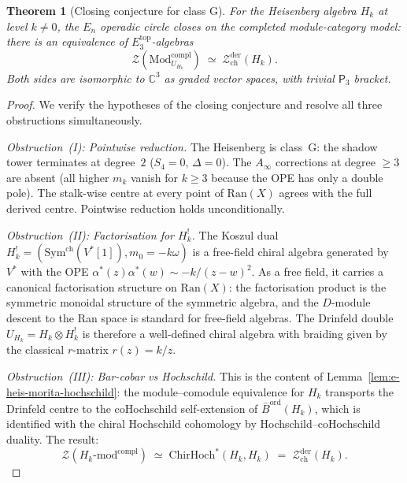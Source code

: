 \documentclass[11pt,reqno]{amsart}
\newtheorem{theorem}{Theorem}[section]
\theoremstyle{definition}
\theoremstyle{remark}
\providecommand{\cZ}{\mathcal{Z}}
\providecommand{\Ran}{\mathrm{Ran}}
\providecommand{\Ainf}{A_\infty}
\providecommand{\Ethree}{E_3}
\providecommand{\En}{E_n}
\providecommand{\Pthree}{\mathsf{P}_3}
\providecommand{\Barord}{\bar{B}^{\mathrm{ord}}}
\providecommand{\ChirHoch}{\mathrm{ChirHoch}}
\providecommand{\bC}{\mathbb{C}}
\providecommand{\Sym}{\mathrm{Sym}}
\begin{document}
\begin{theorem}[Closing conjecture for class G]
\label{thm:e-closing-class-g}
For the Heisenberg algebra $H_k$ at level $k \neq 0$, the
$\En$ operadic circle closes on the completed module-category model:
there is an equivalence of $\Ethree^{\mathrm{top}}$-algebras
\begin{equation}\label{eq:e-closing-class-g}
\mathcal Z(\mathrm{Mod}^{\mathrm{compl}}_{U_{H_k}})
\;\simeq\;
\cZ^{\mathrm{der}}_{\mathrm{ch}}(H_k).
\end{equation}
Both sides are isomorphic to $\bC^3$ as graded vector spaces,
with trivial $\Pthree$ bracket.
\end{theorem}

\begin{proof}
We verify the hypotheses of the closing conjecture
and resolve all three obstructions simultaneously.

\emph{Obstruction~(I): Pointwise reduction.}
The Heisenberg is class~G: the shadow tower
terminates at degree~$2$ ($S_4 = 0$, $\Delta = 0$).
The $\Ainf$ corrections at degree $\ge 3$ are
absent (all higher $m_k$ vanish for $k \ge 3$
because the OPE has only a double pole). The
stalk-wise centre at every point of $\Ran(X)$
agrees with the full derived centre. Pointwise
reduction holds unconditionally.

\emph{Obstruction~(II): Factorisation for $H_k^!$.}
The Koszul dual
$H_k^!=(\Sym^{\mathrm{ch}}(V^*[1]),m_0=-k\omega)$
is a free-field chiral algebra generated by $V^*$
with the OPE
$\alpha^*(z)\alpha^*(w) \sim -k/(z-w)^2$.
As a free field, it carries a canonical factorisation
structure on $\Ran(X)$: the factorisation product is
the symmetric monoidal structure of the symmetric
algebra, and the $D$-module descent to the Ran space
is standard for free-field algebras. The Drinfeld
double $U_{H_k} = H_k \otimes H_k^!$ is therefore a
well-defined chiral algebra with braiding given by the
classical $r$-matrix $r(z) = k/z$.

\emph{Obstruction~(III): Bar-cobar vs Hochschild.}
This is the content of
Lemma~\ref{lem:e-heis-morita-hochschild}: the
module--comodule equivalence for $H_k$ transports the
Drinfeld centre to the coHochschild self-extension of
$\Barord(H_k)$, which is identified with the chiral
Hochschild cohomology by Hochschild--coHochschild
duality. The result:
\[
\mathcal Z(H_k\text{-mod}^{\mathrm{compl}})
\;\simeq\;
\ChirHoch^*(H_k, H_k)
\;=\;
\cZ^{\mathrm{der}}_{\mathrm{ch}}(H_k).
\]


\end{proof}
\end{document}
